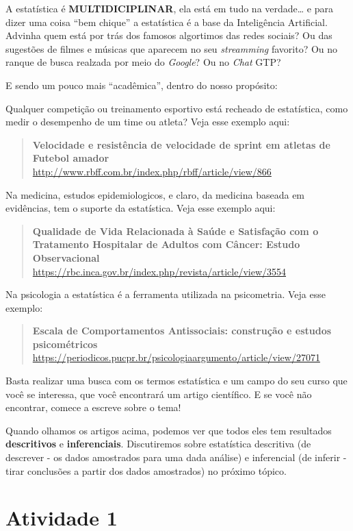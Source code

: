 \documentclass[
]{book}
\begin{document}
A estatística é \textbf{MULTIDICIPLINAR}, ela está em tudo na verdade\ldots{} e para dizer uma coisa ``bem chique'' a estatística é a base da Inteligência Artificial. Advinha quem está por trás dos famosos algortimos das redes sociais? Ou das sugestões de filmes e músicas que aparecem no seu \emph{streamming} favorito? Ou no ranque de busca realzada por meio do \emph{Google}? Ou no \emph{Chat} GTP?

E sendo um pouco mais ``acadêmica'', dentro do nosso propósito:

Qualquer competição ou treinamento esportivo está recheado de estatística, como medir o desempenho de um time ou atleta? Veja esse exemplo aqui:

\begin{quote}
\textbf{Velocidade e resistência de velocidade de sprint em atletas de Futebol amador} \url{http://www.rbff.com.br/index.php/rbff/article/view/866}
\end{quote}

Na medicina, estudos epidemiologicos, e claro, da medicina baseada em evidências, tem o suporte da estatística. Veja esse exemplo aqui:

\begin{quote}
\textbf{Qualidade de Vida Relacionada à Saúde e Satisfação com o Tratamento Hospitalar de Adultos com Câncer: Estudo Observacional} \url{https://rbc.inca.gov.br/index.php/revista/article/view/3554}
\end{quote}

Na psicologia a estatística é a ferramenta utilizada na psicometria. Veja esse exemplo:

\begin{quote}
\textbf{Escala de Comportamentos Antissociais: construção e estudos psicométricos} \url{https://periodicos.pucpr.br/psicologiaargumento/article/view/27071}
\end{quote}

Basta realizar uma busca com os termos estatística e um campo do seu curso que você se interessa, que você encontrará um artigo científico. E se você não encontrar, comece a escreve sobre o tema!

Quando olhamos os artigos acima, podemos ver que todos eles tem resultados \textbf{descritivos} e \textbf{inferenciais}. Discutiremos sobre estatística descritiva (de descrever - os dados amostrados para uma dada análise) e inferencial (de inferir - tirar conclusões a partir dos dados amostrados) no próximo tópico.

\section{Atividade 1}\label{atividade-1}
\end{document}
